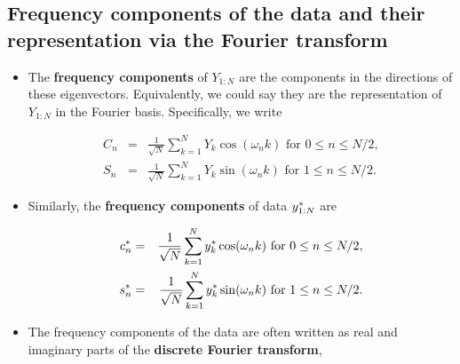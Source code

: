\documentclass[]{article}
\begin{document}
\subsection{Frequency components of the data and their representation
via the Fourier
transform}\label{frequency-components-of-the-data-and-their-representation-via-the-fourier-transform}

\begin{itemize}
\item
  The \textbf{frequency components} of \(Y_{1:N}\) are the components in
  the directions of these eigenvectors. Equivalently, we could say they
  are the representation of \(Y_{1:N}\) in the Fourier basis.
  Specifically, we write

  \begin{eqnarray}
  C_n &=& \frac{1}{\sqrt{N}}\sum_{k=1}^N Y_k\cos(\omega_n k) \mbox{ for $0\le n\le N/2$},
  \\
  S_n &=& \frac{1}{\sqrt{N}}\sum_{k=1}^N Y_k\sin(\omega_n k) \mbox{ for $1\le n\le N/2$}.
  \end{eqnarray}
\item
  Similarly, the \textbf{frequency components} of data
  \(y_{1:N}^*\) are

  \begin{eqnarray}
  c_n^* &=& \frac{1}{\sqrt{N}}\sum_{k=1}^N y_k^*\cos(\omega_n k) \mbox{ for $0\le n\le N/2$},
  \\
  s_n^* &=& \frac{1}{\sqrt{N}}\sum_{k=1}^N y_k^*\sin(\omega_n k) \mbox{ for $1\le n\le N/2$}.
  \end{eqnarray}
\item
  The frequency components of the data are often written as real and
  imaginary parts of the \textbf{discrete Fourier transform},


\end{itemize}
\end{document}
